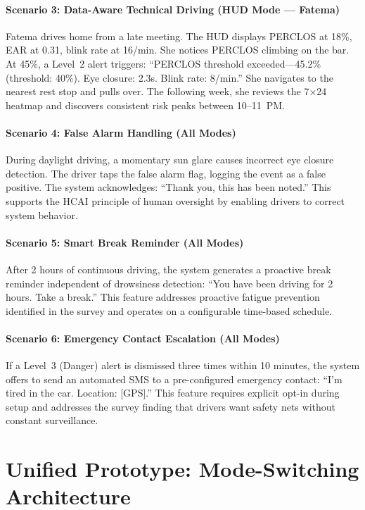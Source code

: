 \documentclass[sigconf]{acmart}
\begin{document}
\paragraph{Scenario 3: Data-Aware Technical Driving (HUD Mode --- Fatema)}
Fatema drives home from a late meeting. The HUD displays PERCLOS at 18\%, EAR at 0.31, blink rate at 16/min. She notices PERCLOS climbing on the bar. At 45\%, a Level~2 alert triggers: ``PERCLOS threshold exceeded---45.2\% (threshold: 40\%). Eye closure: 2.3s. Blink rate: 8/min.'' She navigates to the nearest rest stop and pulls over. The following week, she reviews the 7$\times$24 heatmap and discovers consistent risk peaks between 10--11~PM.

\paragraph{Scenario 4: False Alarm Handling (All Modes)}
During daylight driving, a momentary sun glare causes incorrect eye closure detection. The driver taps the false alarm flag, logging the event as a false positive. The system acknowledges: ``Thank you, this has been noted.'' This supports the HCAI principle of human oversight by enabling drivers to correct system behavior.

\paragraph{Scenario 5: Smart Break Reminder (All Modes)}
After 2 hours of continuous driving, the system generates a proactive break reminder independent of drowsiness detection: ``You have been driving for 2 hours. Take a break.'' This feature addresses proactive fatigue prevention identified in the survey and operates on a configurable time-based schedule.

\paragraph{Scenario 6: Emergency Contact Escalation (All Modes)}
If a Level~3 (Danger) alert is dismissed three times within 10 minutes, the system offers to send an automated SMS to a pre-configured emergency contact: ``I'm tired in the car. Location: [GPS].'' This feature requires explicit opt-in during setup and addresses the survey finding that drivers want safety nets without constant surveillance.


\section{Unified Prototype: Mode-Switching Architecture}
 
\end{document}
